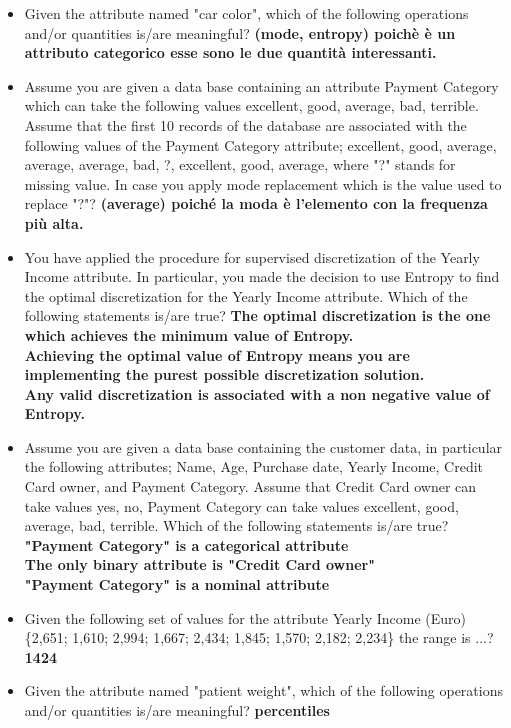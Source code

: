 \documentclass[12pt, a4paper,titlepage,openany]{article}
\begin{document}
\begin{itemize}
	\item Given the attribute named "car color", which of the following operations and/or quantities is/are meaningful? \textbf{(mode, entropy)  poichè è un attributo categorico esse sono le due quantità interessanti.}
	\item Assume you are given a data base containing an attribute Payment Category which can take the following values {excellent, good, average, bad, terrible}. Assume that the first 10 records of the database are associated with the following values of the Payment Category attribute; {excellent, good, average, average, average, bad, ?, excellent, good, average}, where "?" stands for missing value. In case you apply mode replacement which is the value used to replace "?"? \textbf{(average) poiché la moda è l'elemento con la frequenza più alta.}
	\item You have applied the procedure for supervised discretization of the Yearly Income attribute. In particular, you made the decision to use Entropy to find the optimal discretization for the Yearly Income attribute. Which of the following statements is/are true? \textbf{The optimal discretization is the one which achieves the minimum value of Entropy.\\ Achieving the optimal value of Entropy means you are implementing the purest possible discretization solution.\\ Any valid discretization is associated with a non negative value of Entropy.}
	\item Assume you are given a data base containing the customer data, in particular the following attributes; Name, Age, Purchase date, Yearly Income, Credit Card owner, and Payment Category. Assume that Credit Card owner can take values {yes, no}, Payment Category can take values {excellent, good, average, bad, terrible}. Which of the following statements is/are true? \textbf{"Payment Category" is a categorical attribute \\ The only binary attribute is "Credit Card owner"\\ "Payment Category" is a nominal attribute\\}
	\item Given the following set of values for the attribute Yearly Income (Euro) \{2,651; 1,610; 2,994; 1,667; 2,434; 1,845; 1,570; 2,182; 2,234\} the range is ...? \textbf{1424}
	\item Given the attribute named "patient weight", which of the following operations and/or quantities is/are meaningful? \textbf{percentiles}

\end{itemize}
\end{document}
